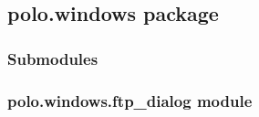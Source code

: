 \documentclass[letterpaper,10pt,english]{sphinxmanual}
\begin{document}
\subsection{polo.windows package}
\label{\detokenize{polo.windows:polo-windows-package}}\label{\detokenize{polo.windows::doc}}

\subsubsection{Submodules}
\label{\detokenize{polo.windows:submodules}}

\subsubsection{polo.windows.ftp\_dialog module}
\label{\detokenize{polo.windows:module-polo.windows.ftp_dialog}}\label{\detokenize{polo.windows:polo-windows-ftp-dialog-module}}
\end{document}
